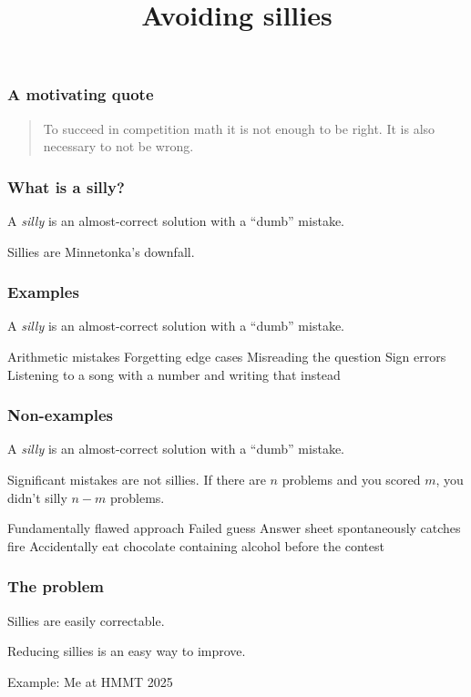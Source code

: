 \documentclass{beamer}
\title{Avoiding sillies}
\begin{document}
\frame{\titlepage}

\begin{frame}
    \frametitle{A motivating quote}
    \begin{quote}
        \sffamily\small
        To succeed in competition math it is not enough to be right. It is also necessary to not be wrong.
    \end{quote}
\end{frame}

\begin{frame}
    \frametitle{What is a silly?}
    \begin{definition}
        A \emph{silly} is an almost-correct solution with a ``dumb'' mistake.
    \end{definition}
    Sillies are Minnetonka's downfall.
\end{frame}

\begin{frame}
    \frametitle{Examples}
    \begin{definition}
        A \emph{silly} is an almost-correct solution with a ``dumb'' mistake.
    \end{definition}
    \begin{itemize}
        \ii Arithmetic mistakes
        \ii Forgetting edge cases
        \ii Misreading the question
        \ii Sign errors
        \pit Listening to a song with a number and writing that instead
    \end{itemize}
\end{frame}

\begin{frame}
    \frametitle{Non-examples}
    \begin{definition}
        A \emph{silly} is an almost-correct solution with a ``dumb'' mistake.
    \end{definition}
    Significant mistakes are not sillies. If there are $n$ problems and you scored $m$, you didn't silly $n - m$ problems.
    \begin{itemize}
        \ii Fundamentally flawed approach
        \ii Failed guess
        \pit Answer sheet spontaneously catches fire
        \pit Accidentally eat chocolate containing alcohol before the contest
    \end{itemize}
\end{frame}

\begin{frame}
    \frametitle{The problem}
    Sillies are easily correctable.

    \begin{corollary}
        Reducing sillies is an easy way to improve.
    \end{corollary}

    Example: Me at HMMT 2025
\end{frame}
\end{document}
